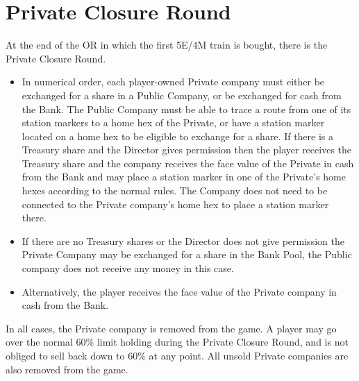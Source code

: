 \documentclass[a4paper,twocolumn]{article}
\begin{document}
\section{Private Closure Round}\label{sec:closing}
At the end of the OR in which the first 5E/4M train is bought, there is the
Private Closure Round.
\begin{itemize}
	\item In numerical order, each player-owned Private company must either be
	exchanged for a share in a Public Company, or be exchanged for cash from the
	Bank. The Public Company must be able to trace a route from one of its
	station markers to a home hex of the Private, or have a station marker
	located on a home hex to be eligible to exchange for a share. If there is a
	Treasury share and the Director gives permission then the player receives
	the Treasury share and the company receives the face value of the Private in
	cash from the Bank and may place a station marker in one of the Private's
	home hexes according to the normal rules. The Company does not need to be
	connected to the Private company's home hex to place a station marker there.
	\item If there are no Treasury shares or the Director does not give
	permission the Private Company may be exchanged for a share in the Bank
	Pool, the Public company does not receive any money in this case.
	\item Alternatively, the player receives the face value of the Private
	company in cash from the Bank.
\end{itemize}
In all cases, the Private company is removed from the game. A player may go over
the normal 60\% limit holding during the Private Closure Round, and is not
obliged to sell back down to 60\% at any point. All unsold Private companies
are also removed from the game.
\end{document}
